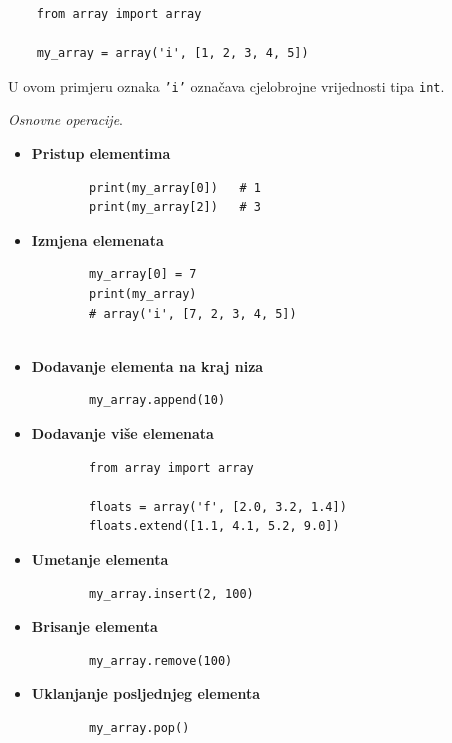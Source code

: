 \begin{verbatim}
	from array import array
	
	my_array = array('i', [1, 2, 3, 4, 5])
\end{verbatim}

U ovom primjeru oznaka \texttt{'i'} označava cjelobrojne vrijednosti tipa \texttt{int}.

\textit{Osnovne operacije}. 

\begin{itemize}
	
	\item \textbf{Pristup elementima}
	
	\begin{verbatim}
		print(my_array[0])   # 1
		print(my_array[2])   # 3
	\end{verbatim}
	
	\item \textbf{Izmjena elemenata}
	
	\begin{verbatim}
		my_array[0] = 7
		print(my_array)
		# array('i', [7, 2, 3, 4, 5])
		
	\end{verbatim}
	
	\item \textbf{Dodavanje elementa na kraj niza}
	
	\begin{verbatim}
		my_array.append(10)
	\end{verbatim}
	
	\item \textbf{Dodavanje više elemenata}
	
	\begin{verbatim}
		from array import array
		
		floats = array('f', [2.0, 3.2, 1.4])
		floats.extend([1.1, 4.1, 5.2, 9.0])
	\end{verbatim}
	
	\item \textbf{Umetanje elementa}
	
	\begin{verbatim}
		my_array.insert(2, 100)
	\end{verbatim}
	
	\item \textbf{Brisanje elementa}
	
	\begin{verbatim}
		my_array.remove(100)
	\end{verbatim}
	
	\item \textbf{Uklanjanje posljednjeg elementa}
	
	\begin{verbatim}
		my_array.pop()
	\end{verbatim}
	
\end{itemize}

